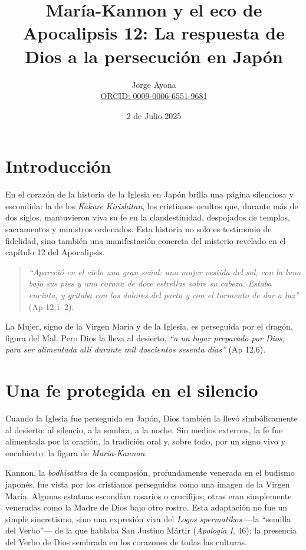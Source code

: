 \documentclass[12pt,a4paper]{article}
\title{\textbf{Mar\'ia-Kannon y el eco de Apocalipsis 12: La respuesta de Dios a la persecuci\'on en Jap\'on}}
\author{Jorge Ayona \\ \href{https://orcid.org/0009-0006-6551-9681 }{ORCID: 0009-0006-6551-9681}}
\date{2 de Julio 2025}
\begin{document}
	
	\addto\captionsspanish{\renewcommand{\refname}{Bibliografía}}
	
	\maketitle
	
	\section*{Introducción}
	
	En el corazón de la historia de la Iglesia en Japón brilla una página silenciosa y escondida: la de los \emph{Kakure Kirishitan}, los cristianos ocultos que, durante más de dos siglos, mantuvieron viva su fe en la clandestinidad, despojados de templos, sacramentos y ministros ordenados. Esta historia no solo es testimonio de fidelidad, sino también una manifestación concreta del misterio revelado en el capítulo 12 del Apocalipsis.
	
	\begin{quote}
		\textit{``Apareció en el cielo una gran señal: una mujer vestida del sol, con la luna bajo sus pies y una corona de doce estrellas sobre su cabeza. Estaba encinta, y gritaba con los dolores del parto y con el tormento de dar a luz''} (Ap 12,1--2).
	\end{quote}
	
	La Mujer, signo de la Virgen María y de la Iglesia, es perseguida por el dragón, figura del Mal. Pero Dios la lleva al desierto, \textit{``a un lugar preparado por Dios, para ser alimentada allí durante mil doscientos sesenta días''} (Ap 12,6).
	
	\section*{Una fe protegida en el silencio}
	
	Cuando la Iglesia fue perseguida en Japón, Dios también la llevó simbólicamente al desierto: al silencio, a la sombra, a la noche. Sin medios externos, la fe fue alimentada por la oración, la tradición oral y, sobre todo, por un signo vivo y encubierto: la figura de \emph{María-Kannon}.
	
	Kannon, la \textit{bodhisattva} de la compasión, profundamente venerada en el budismo japonés, fue vista por los cristianos perseguidos como una imagen de la Virgen María. Algunas estatuas escondían rosarios o crucifijos; otras eran simplemente veneradas como la Madre de Dios bajo otro rostro. Esta adaptación no fue un simple sincretismo, sino una expresión viva del \emph{Logos spermatikos} —la ``semilla del Verbo''— de la que hablaba San Justino Mártir (\emph{Apología I}, 46): la presencia del Verbo de Dios sembrada en los corazones de todas las culturas.
	
\end{document}
